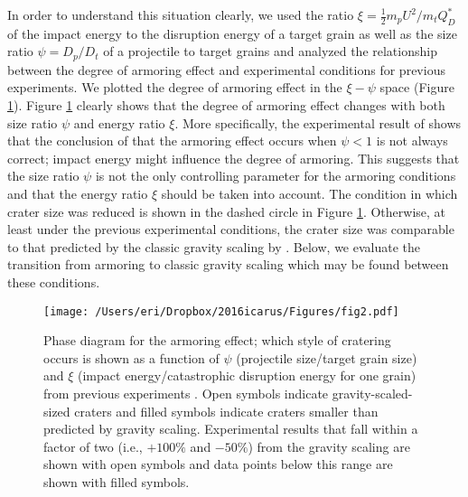 \documentclass[3p,authoryear]{elsarticle}
\begin{document}
 In order to understand this situation clearly, we used the ratio $\xi =\frac{1}{2}m_pU^2/m_tQ_D^*$ of the impact energy to the disruption energy of a target grain as well as the size ratio $\psi=D_p/D_t$ of a projectile to target grains and analyzed the relationship between the degree of armoring effect and experimental conditions for previous experiments. We plotted the degree of armoring effect in the $\xi - \psi$ space (Figure \ref{phase}). Figure \ref{phase} clearly shows that the degree of armoring effect changes with both size ratio $\psi$ and energy ratio $\xi$. More specifically, the experimental result of \citet{holsapple2014} shows that the conclusion of \citet{guettler2012} that the armoring effect occurs when $\psi<1$ is not always correct; impact energy might influence the degree of armoring. This suggests that the size ratio $\psi$ is not the only controlling parameter for the armoring conditions and that the energy ratio $\xi$ should be taken into account. The condition in which crater size was reduced is shown in the dashed circle in Figure \ref{phase}. Otherwise, at least under the previous experimental conditions, the crater size was comparable to that predicted by the classic gravity scaling by \citet{holsapple1993}. Below, we evaluate the transition from armoring to classic gravity scaling which may be found between these conditions.

\begin{figure}[htbp]
\begin{center}
	\texttt{[image: /Users/eri/Dropbox/2016icarus/Figures/fig2.pdf]}
	\caption{Phase diagram for the armoring effect; which style of cratering occurs is shown as a function of $\psi$ (projectile size/target grain size) and $\xi$ (impact energy/catastrophic disruption energy for one grain) from previous experiments \citep{cintala1999,guettler2012,holsapple2014}. Open symbols indicate gravity-scaled-sized craters \citep{holsapple1993} and filled symbols indicate craters smaller than predicted by gravity scaling. Experimental results that fall within a factor of two (i.e., $+100\%$ and $-50\%$) from the gravity scaling are shown with open symbols and data points below this range are shown with filled symbols.}
	\label{phase}
\end{center}
\end{figure}

\end{document}
